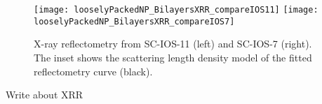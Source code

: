 \documentclass[\main/dresen_thesis.tex]{subfiles}
\begin{document}
  \label{sec:looselyPackedNS:bilayerStacks:xrr}
  \begin{figure}[tb]
    \centering
    \texttt{[image: looselyPackedNP\_BilayersXRR\_compareIOS11]}
    \texttt{[image: looselyPackedNP\_BilayersXRR\_compareIOS7]}
    \caption{\label{fig:looselyPackedNS:bilayerStacks:xrr}X-ray reflectometry from SC-IOS-11 (left) and SC-IOS-7 (right). The inset shows the scattering length density model of the fitted reflectometry curve (black).}
  \end{figure}
  Write about XRR
\end{document}
